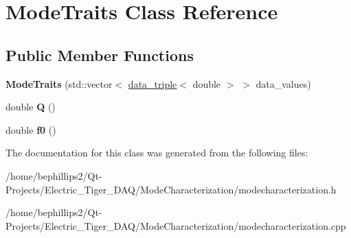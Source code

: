 \hypertarget{class_mode_traits}{}\section{Mode\+Traits Class Reference}
\label{class_mode_traits}
\subsection*{Public Member Functions}
\begin{DoxyCompactItemize}
\item 
{\bfseries Mode\+Traits} (std\+::vector$<$ \hyperlink{structdata__triple}{data\+\_\+triple}$<$ double $>$ $>$ data\+\_\+values)\hypertarget{class_mode_traits_a692c4e3ef4bed868feb77392e0d23673}{}\label{class_mode_traits_a692c4e3ef4bed868feb77392e0d23673}

\item 
double {\bfseries Q} ()\hypertarget{class_mode_traits_a83b44ff9b0e9db253c7cd13b1e51a736}{}\label{class_mode_traits_a83b44ff9b0e9db253c7cd13b1e51a736}

\item 
double {\bfseries f0} ()\hypertarget{class_mode_traits_a903f06c1d611514e42869f6d6b1e387f}{}\label{class_mode_traits_a903f06c1d611514e42869f6d6b1e387f}

\end{DoxyCompactItemize}


The documentation for this class was generated from the following files\+:\begin{DoxyCompactItemize}
\item 
/home/bephillips2/\+Qt-\/\+Projects/\+Electric\+\_\+\+Tiger\+\_\+\+D\+A\+Q/\+Mode\+Characterization/modecharacterization.\+h\item 
/home/bephillips2/\+Qt-\/\+Projects/\+Electric\+\_\+\+Tiger\+\_\+\+D\+A\+Q/\+Mode\+Characterization/modecharacterization.\+cpp\end{DoxyCompactItemize}
